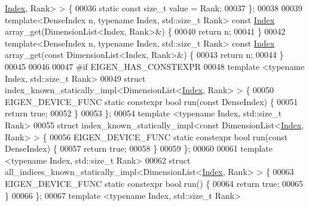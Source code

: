 \begin{DoxyCode}
      \hyperlink{namespace_eigen_a62e77e0933482dafde8fe197d9a2cfde}{Index}, Rank> > \{
00036   \textcolor{keyword}{static} \textcolor{keyword}{const} \textcolor{keywordtype}{size\_t} value = Rank;
00037 \};
00038 
00039 \textcolor{keyword}{template}<DenseIndex n, \textcolor{keyword}{typename} Index, std::\textcolor{keywordtype}{size\_t} Rank> \textcolor{keyword}{const} \hyperlink{namespace_eigen_a62e77e0933482dafde8fe197d9a2cfde}{Index} array\_get(DimensionList<Index,
       Rank>&) \{
00040   \textcolor{keywordflow}{return} n;
00041 \}
00042 \textcolor{keyword}{template}<DenseIndex n, \textcolor{keyword}{typename} Index, std::\textcolor{keywordtype}{size\_t} Rank> \textcolor{keyword}{const} \hyperlink{namespace_eigen_a62e77e0933482dafde8fe197d9a2cfde}{Index} array\_get(\textcolor{keyword}{const} 
      DimensionList<Index, Rank>&) \{
00043   \textcolor{keywordflow}{return} n;
00044 \}
00045 
00046 
00047 \textcolor{preprocessor}{#if EIGEN\_HAS\_CONSTEXPR}
00048 \textcolor{keyword}{template} <\textcolor{keyword}{typename} Index, std::\textcolor{keywordtype}{size\_t} Rank>
00049 \textcolor{keyword}{struct }index\_known\_statically\_impl<DimensionList<\hyperlink{namespace_eigen_a62e77e0933482dafde8fe197d9a2cfde}{Index}, Rank> > \{
00050   EIGEN\_DEVICE\_FUNC \textcolor{keyword}{static} constexpr \textcolor{keywordtype}{bool} run(\textcolor{keyword}{const} DenseIndex) \{
00051     \textcolor{keywordflow}{return} \textcolor{keyword}{true};
00052   \}
00053 \};
00054 \textcolor{keyword}{template} <\textcolor{keyword}{typename} Index, std::\textcolor{keywordtype}{size\_t} Rank>
00055 \textcolor{keyword}{struct }index\_known\_statically\_impl<const DimensionList<\hyperlink{namespace_eigen_a62e77e0933482dafde8fe197d9a2cfde}{Index}, Rank> > \{
00056   EIGEN\_DEVICE\_FUNC \textcolor{keyword}{static} constexpr \textcolor{keywordtype}{bool} run(\textcolor{keyword}{const} DenseIndex) \{
00057     \textcolor{keywordflow}{return} \textcolor{keyword}{true};
00058   \}
00059 \};
00060 
00061 \textcolor{keyword}{template} <\textcolor{keyword}{typename} Index, std::\textcolor{keywordtype}{size\_t} Rank>
00062 \textcolor{keyword}{struct }all\_indices\_known\_statically\_impl<DimensionList<\hyperlink{namespace_eigen_a62e77e0933482dafde8fe197d9a2cfde}{Index}, Rank> > \{
00063   EIGEN\_DEVICE\_FUNC \textcolor{keyword}{static} constexpr \textcolor{keywordtype}{bool} run() \{
00064     \textcolor{keywordflow}{return} \textcolor{keyword}{true};
00065   \}
00066 \};
00067 \textcolor{keyword}{template} <\textcolor{keyword}{typename} Index, std::\textcolor{keywordtype}{size\_t} Rank>

\end{DoxyCode}
